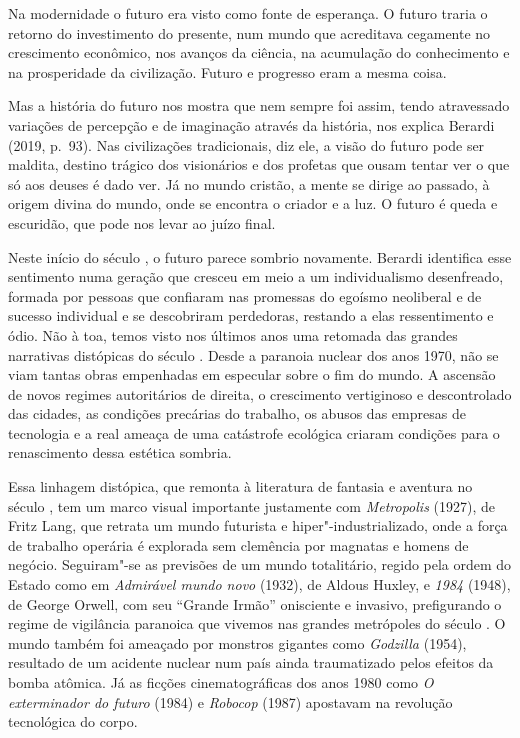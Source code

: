 Na modernidade o futuro era visto como fonte de esperança. O futuro
traria o retorno do investimento do presente, num mundo que acreditava
cegamente no crescimento econômico, nos avanços da ciência, na
acumulação do conhecimento e na prosperidade da civilização. Futuro e
progresso eram a mesma coisa.

Mas a história do futuro nos mostra que nem sempre foi assim, tendo
atravessado variações de percepção e de imaginação através da história,
nos explica Berardi (2019, p.~93). Nas civilizações tradicionais, diz
ele, a visão do futuro pode ser maldita, destino trágico dos visionários
e dos profetas que ousam tentar ver o que só aos deuses é dado ver. Já
no mundo cristão, a mente se dirige ao passado, à origem divina do
mundo, onde se encontra o criador e a luz. O futuro é queda e escuridão,
que pode nos levar ao juízo final.

Neste início do século , o futuro parece sombrio novamente. Berardi
identifica esse sentimento numa geração que cresceu em meio a um
individualismo desenfreado, formada por pessoas que confiaram nas
promessas do egoísmo neoliberal e de sucesso individual e se descobriram
perdedoras, restando a elas ressentimento e ódio. Não à toa, temos visto
nos últimos anos uma retomada das grandes narrativas distópicas do
século . Desde a paranoia nuclear dos anos 1970, não se viam tantas
obras empenhadas em especular sobre o fim do mundo. A ascensão de novos
regimes autoritários de direita, o crescimento vertiginoso e
descontrolado das cidades, as condições precárias do trabalho, os abusos
das empresas de tecnologia e a real ameaça de uma catástrofe ecológica
criaram condições para o renascimento dessa estética sombria.

Essa linhagem distópica, que remonta à literatura de fantasia e aventura
no século , tem um marco visual importante justamente com
\emph{Metropolis} (1927), de Fritz Lang, que retrata um mundo futurista
e hiper"-industrializado, onde a força de trabalho operária é explorada
sem clemência por magnatas e homens de negócio. Seguiram"-se as previsões
de um mundo totalitário, regido pela ordem do Estado como em
\emph{Admirável mundo novo} (1932), de Aldous Huxley, e \emph{1984} (1948), de George Orwell, com seu
``Grande Irmão'' onisciente e invasivo, prefigurando o regime de
vigilância paranoica que vivemos nas grandes metrópoles do século . O
mundo também foi ameaçado por monstros gigantes como \emph{Godzilla} (1954),
resultado de um acidente nuclear num país ainda traumatizado pelos
efeitos da bomba atômica. Já as ficções cinematográficas dos anos 1980
como \emph{O exterminador do futuro} (1984) e \emph{Robocop} (1987)
apostavam na revolução tecnológica do corpo.

